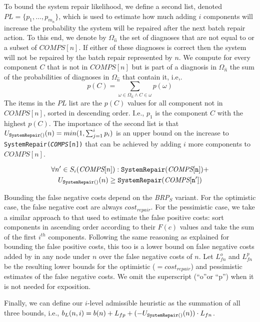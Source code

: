\documentclass[a4paper,11pt]{report}
\newcommand\sysrep[1]{{\tt SystemRepair(#1)}}
\newcommand{\brps}{\textit{BRP$_S$}}
\newcommand{\comps}{\textit{COMPS}}
\begin{document}
To bound the system repair likelihood, we define a second list, denoted $PL=\{p_1,\ldots, p_{m_n}\}$, which is used to estimate how much adding $i$ components will increase the probability the system will be repaired after the next batch repair action. To this end, we denote by $\Omega_{\hat{n}}$ the set of diagnoses that are not equal to or a subset of $\comps[n]$. If either of these diagnoses is correct then the system will not be repaired by the batch repair represented by $n$. We compute for every component $C$ that is not in $\comps[n]$ but is part of a  diagnosis in $\Omega_{\hat{n}}$ the sum of the probabilities of diagnoses in $\Omega_{\hat{n}}$ that contain it, i.e,. 
\[ p(C)=\sum_{\omega\in \Omega_{\hat{n}}\wedge C\in \omega} p(\omega) \]
The items in the $PL$ list are the $p(C)$ values for all component not in $\comps[n]$, 
sorted in descending order. I.e., $p_1$ is the component $C$ with the highest $p(C)$. 
The importance of the second list is that $U_{\sysrep{}}(n)=min(1, \sum_{j=1}^i p_i)$ is an upper bound on 
the increase to \sysrep{\comps[n]} that can be achieved by adding $i$ more components 
to $\comps[n]$. 

\begin{multline}
\forall n'\in S_i(\comps[n])  : \sysrep{\comps[n]}+\\ U_{\sysrep{}}(n) 
 \geq  \sysrep{\comps[n']}
\label{eq:sysrep-bound}
\end{multline}

Bounding the false negative costs depend on the \brps{} variant. For the optimistic case, 
the false negative cost are always $cost_{repair}$. 
For the pessimistic case, we take a similar approach to that used to estimate the false positive costs: 
sort components in ascending order according to their $F(c)$ values and take the sum of the first $i^{th}$ components. Following the same reasoning as explained for bounding the false positive costs, this too is a lower bound on false negative costs added by in any node under $n$ over the false negative costs of $n$. 
Let $L^o_{fn}$ and $L^p_{fn}$ be the resulting lower bounds for the optimistic ($=cost_{repair}$) 
and pessimistic estimates of the false negative costs. We omit the superscript (``o''or ``p'') 
when it is not needed for exposition. 

Finally, we can define our $i$-level admissible heuristic as the summation of all three bounds, 
i.e., $b_L(n,i)=b(n)+L_{fp}+(-U_{\sysrep{}}(n))\cdot L_{fn}$. 
\end{document}
